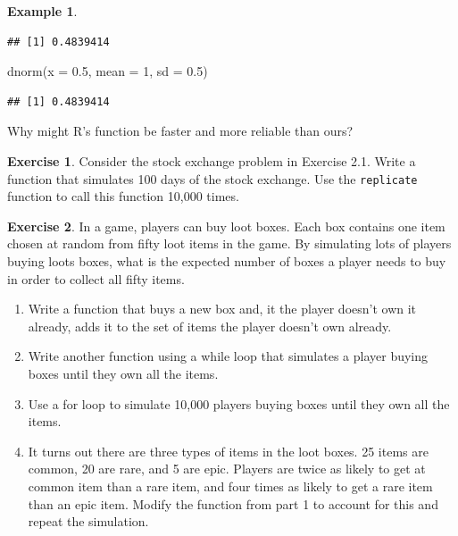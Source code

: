 \documentclass[
]{book}
\newenvironment{Shaded}{\begin{snugshade}}{\end{snugshade}}
\newcommand{\AttributeTok}[1]{\textcolor[rgb]{0.77,0.63,0.00}{#1}}
\newcommand{\DecValTok}[1]{\textcolor[rgb]{0.00,0.00,0.81}{#1}}
\newcommand{\FloatTok}[1]{\textcolor[rgb]{0.00,0.00,0.81}{#1}}
\newcommand{\FunctionTok}[1]{\textcolor[rgb]{0.00,0.00,0.00}{#1}}
\newcommand{\NormalTok}[1]{#1}
\theoremstyle{definition}
\theoremstyle{definition}
\newtheorem{example}{Example}[chapter]
\theoremstyle{definition}
\newtheorem{exercise}{Exercise}[chapter]
\theoremstyle{definition}
\theoremstyle{remark}
\begin{document}
\begin{example}
\begin{verbatim}
## [1] 0.4839414
\end{verbatim}

\begin{Shaded}
\begin{Highlighting}[]
\FunctionTok{dnorm}\NormalTok{(}\AttributeTok{x =} \FloatTok{0.5}\NormalTok{, }\AttributeTok{mean =} \DecValTok{1}\NormalTok{, }\AttributeTok{sd =} \FloatTok{0.5}\NormalTok{)}
\end{Highlighting}
\end{Shaded}

\begin{verbatim}
## [1] 0.4839414
\end{verbatim}

Why might R's function be faster and more reliable than ours?
\end{example}

\begin{exercise}
Consider the stock exchange problem in Exercise 2.1. Write a function that simulates 100 days of the stock exchange. Use the \texttt{replicate} function to call this function 10,000 times.
\end{exercise}

\begin{exercise}

In a game, players can buy loot boxes. Each box contains one item chosen at random from fifty loot items in the game. By simulating lots of players buying loots boxes, what is the expected number of boxes a player needs to buy in order to collect all fifty items.

\begin{enumerate}
\def\labelenumi{\arabic{enumi}.}
\item
  Write a function that buys a new box and, it the player doesn't own it already, adds it to the set of items the player doesn't own already.
\item
  Write another function using a while loop that simulates a player buying boxes until they own all the items.
\item
  Use a for loop to simulate 10,000 players buying boxes until they own all the items.
\item
  It turns out there are three types of items in the loot boxes. 25 items are common, 20 are rare, and 5 are epic. Players are twice as likely to get at common item than a rare item, and four times as likely to get a rare item than an epic item. Modify the function from part 1 to account for this and repeat the simulation.
\end{enumerate}

\end{exercise}
\end{document}
